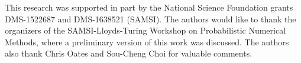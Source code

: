 \documentclass[twocolumn]{svjour3}          %
\begin{document}
\fi



\begin{acknowledgements}
This research was supported in part by the National Science Foundation grants DMS-1522687 and DMS-1638521 (SAMSI).
The authors would like to thank the organizers of the SAMSI-Lloyds-Turing Workshop on Probabilistic Numerical Methods, where a preliminary version of this work was discussed.  The authors also thank Chris Oates and Sou-Cheng Choi for valuable comments.
\end{acknowledgements}

\end{document}
